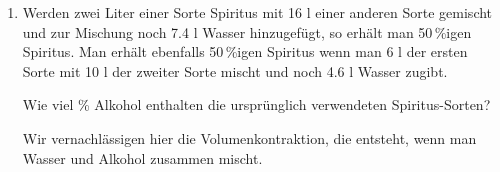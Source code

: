 \begin{enumerate}[label=\alph*)]
Numa Nussbaumer handelt mit Nüssen. Numa möchte eine Nussmischung aus zwei
Sorten zusammenstellen: Walnüsse (Sorte $A$) und Mandeln (Sorte $B$).

Mischt Numa 4 kg Walnüsse mit 6 kg Mandeln, so kostet die gesamte
Mischung CHF 84.-

Werden hingegen 7 kg Walnüsse mit 3 kg Mandeln gemischt, so kostet 1
kg der zweiten Mischung CHF 9.90.

Wie viel kostet 1 kg Walnüsse? Wie viel 1 kg Mandeln?


\item
Werden zwei Liter einer Sorte Spiritus mit 16 l einer anderen Sorte
gemischt und zur Mischung noch 7.4 l Wasser hinzugefügt, so erhält man
50\,\%igen Spiritus. Man erhält ebenfalls 50\,\%igen Spiritus wenn man 6 l
der ersten Sorte mit 10 l der zweiter Sorte mischt und noch 4.6 l
Wasser zugibt.

Wie viel \% Alkohol enthalten die ursprünglich verwendeten
Spiritus-Sorten?

Wir vernachlässigen hier die Volumenkontraktion, die entsteht, wenn man
Wasser und Alkohol zusammen mischt.


\end{enumerate}\newpage

